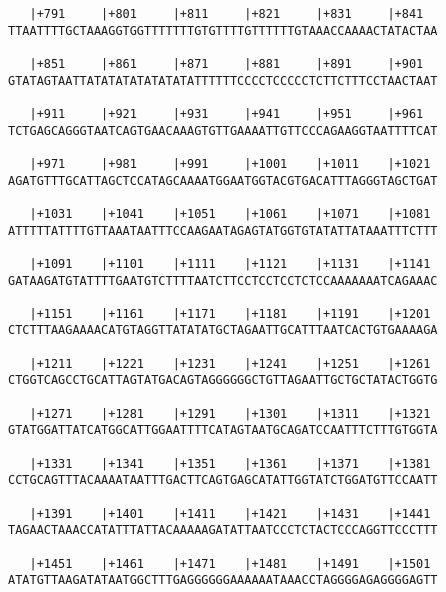 \documentclass{article}
\begin{document}
\begin{Verbatim}
   |+791     |+801     |+811     |+821     |+831     |+841  
TTAATTTTGCTAAAGGTGGTTTTTTTGTGTTTTGTTTTTTGTAAACCAAAACTATACTAA
                                                            
   |+851     |+861     |+871     |+881     |+891     |+901  
GTATAGTAATTATATATATATATATATTTTTTCCCCTCCCCCTCTTCTTTCCTAACTAAT
                                                            
   |+911     |+921     |+931     |+941     |+951     |+961  
TCTGAGCAGGGTAATCAGTGAACAAAGTGTTGAAAATTGTTCCCAGAAGGTAATTTTCAT
                                                            
   |+971     |+981     |+991     |+1001    |+1011    |+1021 
AGATGTTTGCATTAGCTCCATAGCAAAATGGAATGGTACGTGACATTTAGGGTAGCTGAT
                                                            
   |+1031    |+1041    |+1051    |+1061    |+1071    |+1081 
ATTTTTATTTTGTTAAATAATTTCCAAGAATAGAGTATGGTGTATATTATAAATTTCTTT
                                                            
   |+1091    |+1101    |+1111    |+1121    |+1131    |+1141 
GATAAGATGTATTTTGAATGTCTTTTAATCTTCCTCCTCCTCTCCAAAAAAATCAGAAAC
                                                            
   |+1151    |+1161    |+1171    |+1181    |+1191    |+1201 
CTCTTTAAGAAAACATGTAGGTTATATATGCTAGAATTGCATTTAATCACTGTGAAAAGA
                                                            
   |+1211    |+1221    |+1231    |+1241    |+1251    |+1261 
CTGGTCAGCCTGCATTAGTATGACAGTAGGGGGGCTGTTAGAATTGCTGCTATACTGGTG
                                                            
   |+1271    |+1281    |+1291    |+1301    |+1311    |+1321 
GTATGGATTATCATGGCATTGGAATTTTCATAGTAATGCAGATCCAATTTCTTTGTGGTA
                                                            
   |+1331    |+1341    |+1351    |+1361    |+1371    |+1381 
CCTGCAGTTTACAAAATAATTTGACTTCAGTGAGCATATTGGTATCTGGATGTTCCAATT
                                                            
   |+1391    |+1401    |+1411    |+1421    |+1431    |+1441 
TAGAACTAAACCATATTTATTACAAAAAGATATTAATCCCTCTACTCCCAGGTTCCCTTT
                                                            
   |+1451    |+1461    |+1471    |+1481    |+1491    |+1501 
ATATGTTAAGATATAATGGCTTTGAGGGGGGAAAAAATAAACCTAGGGGAGAGGGGAGTT
                                                            

\end{Verbatim}
\end{document}
